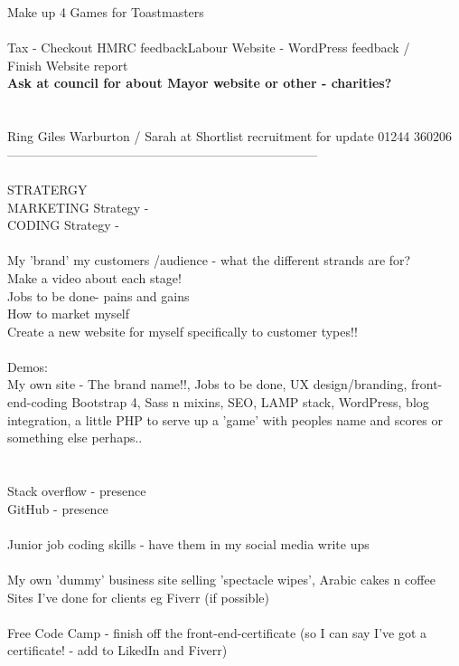 \documentclass[10pt,a4paper]{article}
\begin{document}
{{{{{{{{{{{{{{{{{{{{{{{Make up 4 Games for Toastmasters\\
\\
Tax - Checkout HMRC feedback}{\large Labour Website - WordPress feedback / }{\large \\
Finish Website report\\
\textbf{Ask at council for about Mayor website or other - charities?}}{\large {\large {\large \\
\\
\\
Ring Giles  Warburton / Sarah at Shortlist recruitment for update  01244 360206\\
--------------------------------------------------------------------------\\
\\
STRATERGY\\
	MARKETING Strategy - \\
	CODING Strategy - \\
\\
My 'brand' my customers /audience - what the different strands are for?\\
Make a video about each stage!\\
Jobs to be done- pains and gains\\
How to market myself\\
Create a new website for myself specifically to customer types!!\\
\\
Demos:\\
My own site - The brand name!!, Jobs to be done, UX design/branding, front-end-coding Bootstrap 4, Sass n mixins, SEO, LAMP stack, WordPress, blog integration,  a little PHP to serve up a 'game' with peoples name and scores or something else perhaps..\\
\\
\\
Stack overflow - presence\\
GitHub - presence\\
\\
Junior job coding skills - have them in my social media write ups\\
\\
My own 'dummy' business site selling 'spectacle wipes', Arabic cakes n  coffee\\
Sites I've done for clients eg Fiverr (if possible)\\
\\
Free Code Camp - finish off the front-end-certificate (so I can say I've got  a certificate! - add to LikedIn and Fiverr)\\
}}}}}}}}}}}}}}}}}}}}}}}}}
\end{document}
